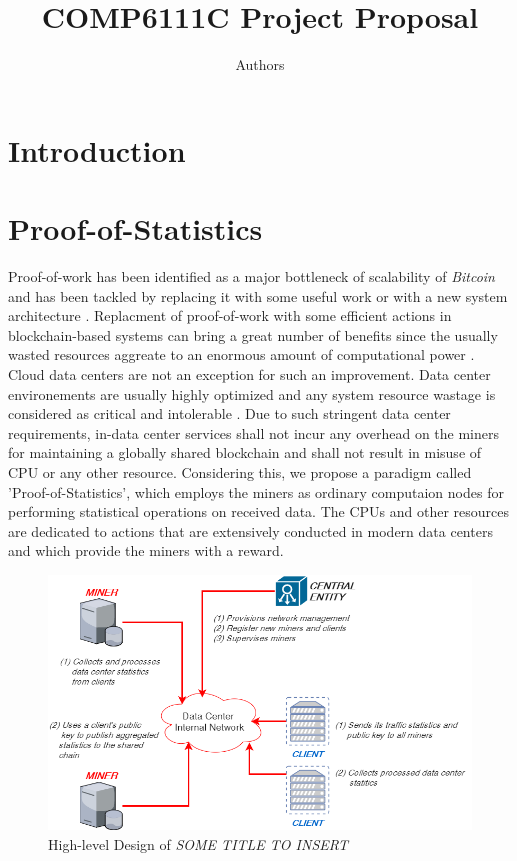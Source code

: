 \documentclass{article}
\title{COMP6111C Project Proposal}
\author{Authors}
\date{}
\newcommand{\projTitle}{SOME TITLE TO INSERT}
\begin{document}
\maketitle


\section{Introduction}


\section{Proof-of-Statistics}
Proof-of-work has been identified as a major bottleneck of scalability of \textit{Bitcoin}  and has been tackled by replacing it with some useful work \cite{filecoin-storage} or with a new system architecture \cite{RSCoin-bank}.  Replacment of proof-of-work with some  
efficient actions in blockchain-based systems can bring a great number of benefits since the usually wasted resources aggreate to an enormous amount of  computational power \cite{bitcoin-comp-elec-power}. Cloud data centers are not an exception for such an 
improvement. Data center environements are usually highly optimized and any system resource wastage is considered as critical and intolerable \cite{google-ai-power, facebook-cold-storage-rack}. Due to such stringent data center requirements, in-data center services
shall not incur any overhead on the miners for maintaining a globally shared blockchain and shall not result in misuse of CPU or any other resource. Considering this, we propose a paradigm called 'Proof-of-Statistics', which employs the miners as ordinary computaion nodes
for performing statistical operations on received data. The CPUs and other resources are dedicated to actions that are extensively conducted in modern data centers \cite{microsoft-autopilot} and which provide the miners with a reward. 

\begin{figure}[h!]
  \includegraphics[width=0.6\linewidth]{figures/project_design.png}
  \caption{High-level Design of \textit{\projTitle}}
  \label{fig:project_design}
\end{figure}
\end{document}
